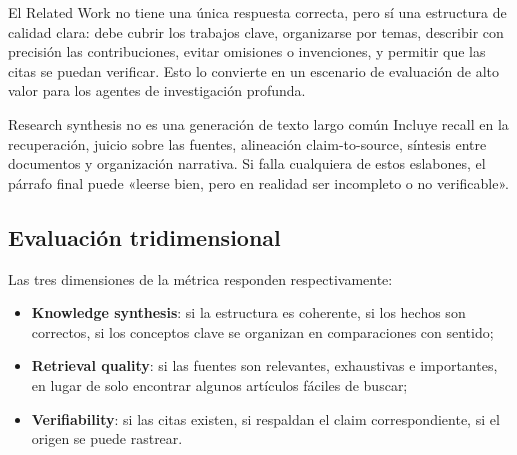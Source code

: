 \documentclass[a4paper]{article}
\begin{document}

El Related Work no tiene una única respuesta correcta, pero sí una estructura de calidad clara: debe cubrir los trabajos clave, organizarse por temas, describir con precisión las contribuciones, evitar omisiones o invenciones, y permitir que las citas se puedan verificar. Esto lo convierte en un escenario de evaluación de alto valor para los agentes de investigación profunda.

\begin{knowledgebox}{Research synthesis no es una generación de texto largo común}
Incluye recall en la recuperación, juicio sobre las fuentes, alineación claim-to-source, síntesis entre documentos y organización narrativa. Si falla cualquiera de estos eslabones, el párrafo final puede «leerse bien, pero en realidad ser incompleto o no verificable».
\end{knowledgebox}

\subsection{Evaluación tridimensional}


Las tres dimensiones de la métrica responden respectivamente:

\begin{itemize}
    \item \textbf{Knowledge synthesis}: si la estructura es coherente, si los hechos son correctos, si los conceptos clave se organizan en comparaciones con sentido;
    \item \textbf{Retrieval quality}: si las fuentes son relevantes, exhaustivas e importantes, en lugar de solo encontrar algunos artículos fáciles de buscar;
    \item \textbf{Verifiability}: si las citas existen, si respaldan el claim correspondiente, si el origen se puede rastrear.
\end{itemize}

\end{document}
